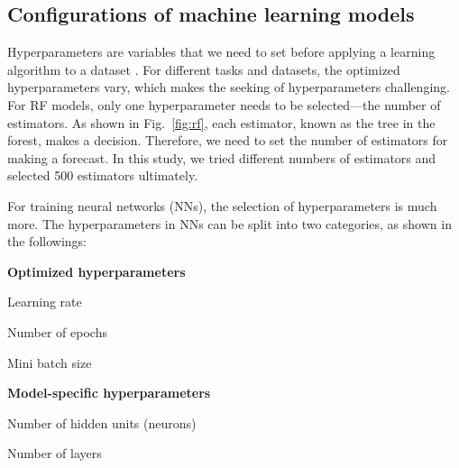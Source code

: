 \subsection{Configurations of machine learning models}
Hyperparameters are variables that we need to set before applying a learning algorithm to a dataset \citep{agrawalHyperparametersDeepLearning2019}. For different tasks and datasets, the optimized hyperparameters vary, which makes the seeking of hyperparameters challenging. For RF models, only one hyperparameter needs to be selected---the number of estimators. As shown in Fig.~\ref{fig:rf}, each estimator, known as the tree in the forest, makes a decision. Therefore, we need to set the number of estimators for making a forecast. In this study, we tried different numbers of estimators and selected 500 estimators ultimately.

For training neural networks (NNs), the selection of hyperparameters is much more. The hyperparameters in NNs can be split into two categories, as shown in the followings:

\noindent
\textbf{Optimized hyperparameters}\\
\begin{myenumerate}
    \item Learning rate
    \item Number of epochs
    \item Mini batch size
\end{myenumerate}

\noindent
\textbf{Model-specific hyperparameters}\\
\begin{myenumerate}
    \item Number of hidden units (neurons)
    \item Number of layers
\end{myenumerate}

